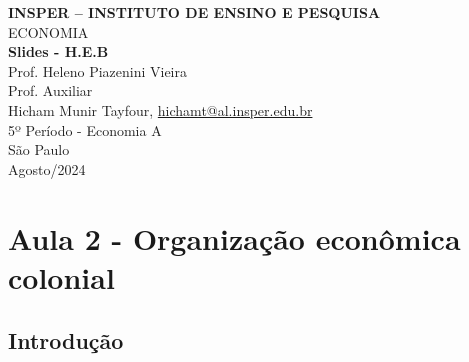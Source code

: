\documentclass[a4paper,12pt]{article}[abntex2]
\begin{document}
\begin{titlepage}
    \centering
    \vspace*{1cm}
    \Large\textbf{INSPER – INSTITUTO DE ENSINO E PESQUISA}\\
    \Large ECONOMIA\\
    \vspace{1.5cm}
    \Large\textbf{Slides - H.E.B}\\
    \vspace{1.5cm}
    Prof. Heleno Piazenini Vieira\\
    Prof. Auxiliar \\
    \vfill
    \normalsize
    Hicham Munir Tayfour, \href{mailto:hichamt@al.insper.edu.br}{hichamt@al.insper.edu.br}\\
    5º Período - Economia A\\
    \vfill
    São Paulo\\
    Agosto/2024
\end{titlepage}

\newpage
\tableofcontents
\thispagestyle{empty} %

\newpage 
\listoffigures
\thispagestyle{empty} %

\newpage
\setcounter{page}{1} %
\justify
\onehalfspacing

\pagestyle{fancy}
\fancyhf{}
\rhead{\thepage}

\section{\textbf{Aula 2 - Organização econômica colonial}}

\subsection{\textbf{Introdução}}
\end{document}

